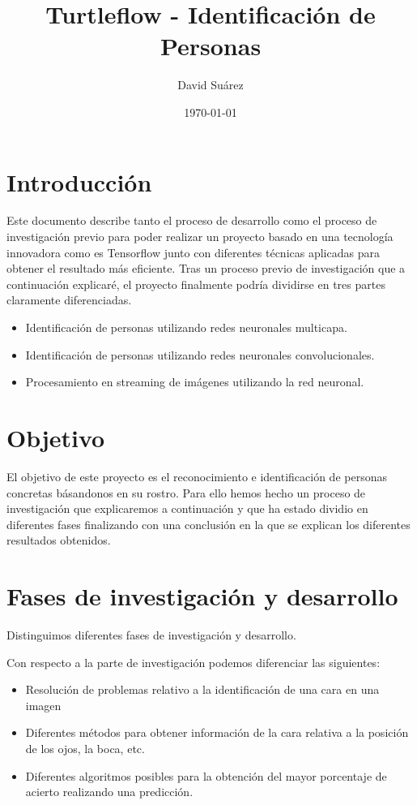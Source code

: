 \documentclass{article}
\title{Turtleflow - Identificación de Personas}
\author{David Suárez}
\date{\today}
\begin{document}
\maketitle

\section{Introducción}
Este documento describe tanto el proceso de desarrollo como el proceso de investigación previo para poder realizar un proyecto basado en una tecnología innovadora como es Tensorflow junto con diferentes técnicas aplicadas para obtener el resultado más eficiente.
Tras un proceso previo de investigación que a continuación explicaré, el proyecto finalmente podría dividirse en tres partes claramente diferenciadas.
\begin{itemize}
\item Identificación de personas utilizando redes neuronales multicapa.
\item Identificación de personas utilizando redes neuronales convolucionales.
\item Procesamiento en streaming de imágenes utilizando la red neuronal.
\end{itemize}

\section{Objetivo}
El objetivo de este proyecto es el reconocimiento e identificación de personas concretas básandonos en su rostro. Para ello hemos hecho un proceso de investigación que explicaremos a continuación y que ha estado dividio en diferentes fases finalizando con una conclusión en la que se explican los diferentes resultados obtenidos.

\section{Fases de investigación y desarrollo}
Distinguimos diferentes fases de investigación y desarrollo.\newline

Con respecto a la parte de investigación podemos diferenciar las siguientes:
\begin{itemize}
\item Resolución de problemas relativo a la identificación de una cara en una imagen
\item Diferentes métodos para obtener información de la cara relativa a la posición de los ojos, la boca, etc.
\item Diferentes algoritmos posibles para la obtención del mayor porcentaje de acierto realizando una predicción.
\end{itemize}
\end{document}
